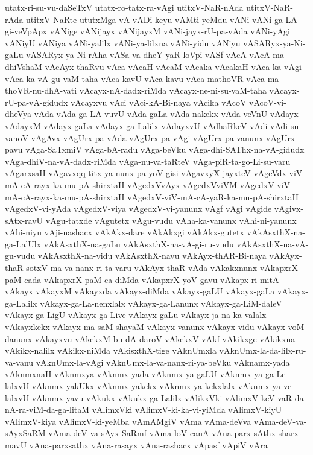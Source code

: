 {utatx-ri-su-vu-daSeTxV
utatx-ro-tatx-ra-vAgi
utitxV-NaR-nAda
utitxV-NaR-rAda
utitxV-NaRte
ututxMga
vA
vADi-keyu
vAMti-yeMdu
vANi
vANi-ga-LA-gi-veVpApx
vANige
vANijayx
vANijayxM
vANi-jayx-rU-pa-vAda
vANi-yAgi
vANiyU
vANiya
vANi-yalilx
vANi-ya-lilxna
vANi-yidu
vANiyu
vASARyx-ya-Ni-gaLu
vASARyx-ya-Ni-rAha
vASa-va-dheY-yaR-loVpi
vASf
vAcA
vAcA-ma-dhiVshaM
vAcAyx-thaRvu
vAca
vAcaH
vAcaM
vAcaka
vAcakaH
vAca-ka-vAgi
vAca-ka-vA-gu-vaM-taha
vAca-kavU
vAca-kavu
vAca-mathoVR
vAca-ma-thoVR-nu-dhA-vati
vAcayx-nA-dadx-riMda
vAcayx-ne-ni-su-vaM-taha
vAcayx-rU-pa-vA-gidudx
vAcayxvu
vAci
vAci-kA-Bi-naya
vAcika
vAcoV
vAcoV-vi-dheVya
vAda
vAda-ga-LA-vuvU
vAda-gaLa
vAda-nakekx
vAda-veVnU
vAdayx
vAdayxM
vAdayx-gaLa
vAdayx-ga-Lalilx
vAdayxvU
vAdhaRkeV
vAdi
vAdi-su-vanoV
vAgAvx
vAgUrx-pa-vAda
vAgUrx-pa-vAgi
vAgUrx-pa-vanunx
vAgUrx-pavu
vAga-SaTxmiV
vAga-bA-radu
vAga-beVku
vAga-dhi-SAThx-na-vA-gidudx
vAga-dhiV-na-vA-dadx-riMda
vAga-nu-va-taRteV
vAga-piR-ta-go-Li-su-varu
vAgarxsaH
vAgavxqq-titx-ya-nunx-pa-yoV-gisi
vAgavxyX-jayxteV
vAgeVdx-viV-mA-cA-rayx-ka-mu-pA-shirxtaH
vAgedxVvAyx
vAgedxVviVM
vAgedxV-viV-mA-cA-rayx-ka-mu-pA-shirxtaH
vAgedxV-viV-mA-cA-yaR-ka-mu-pA-shirxtaH
vAgedxV-vi-yAda
vAgedxV-viya
vAgedxV-vi-yanunx
vAgf
vAgi
vAgide
vAgivx-sAtx-ravU
vAgu-tatxde
vAgutetx
vAgu-vudu
vAha-ka-vanunx
vAhi-ni-yanunx
vAhi-niyu
vAji-nashacx
vAkAkx-dare
vAkAkxgi
vAkAkx-gutetx
vAkAsxthX-na-ga-LalUlx
vAkAsxthX-na-gaLu
vAkAsxthX-na-vA-gi-ru-vudu
vAkAsxthX-na-vA-gu-vudu
vAkAsxthX-na-vidu
vAkAsxthX-navu
vAkAyx-thAR-Bi-naya
vAkAyx-thaR-sotxV-ma-va-nanx-ri-ta-varu
vAkAyx-thaR-vAda
vAkakxnunx
vAkapxrX-paM-cada
vAkapxrX-paM-ca-diMda
vAkapxrX-yoV-gavu
vAkapx-ri-mitA
vAkayx
vAkayxM
vAkayxda
vAkayx-diMda
vAkayx-gaLU
vAkayx-gaLa
vAkayx-ga-Lalilx
vAkayx-ga-La-nenxlalx
vAkayx-ga-Lanunx
vAkayx-ga-LiM-daleV
vAkayx-ga-LigU
vAkayx-ga-Live
vAkayx-gaLu
vAkayx-ja-na-ka-valalx
vAkayxkekx
vAkayx-ma-saM-shayaM
vAkayx-vanunx
vAkayx-vidu
vAkayx-voM-danunx
vAkayxvu
vAkekxM-bu-dA-daroV
vAkekxV
vAkf
vAkikxge
vAkikxna
vAkikx-nalilx
vAkikx-niMda
vAkisxthX-tige
vAknUmxla
vAknUmx-la-da-lilx-ru-va-vanu
vAknUmx-la-vAgi
vAknUmx-la-va-nanx-ri-ya-beVku
vAknamx-yada
vAknmxnaH
vAknmxya
vAknmx-yada
vAknmx-ya-gaLU
vAknmx-ya-ga-Le-lalxvU
vAknmx-yakUkx
vAknmx-yakekx
vAknmx-ya-kekxlalx
vAknmx-ya-ve-lalxvU
vAknmx-yavu
vAkukx
vAkukx-ga-Lalilx
vAlikxVki
vAlimxV-keV-vaR-da-nA-ra-viM-da-ga-litaM
vAlimxVki
vAlimxV-ki-ka-vi-yiMda
vAlimxV-kiyU
vAlimxV-kiya
vAlimxV-ki-yeMba
vAmAMgiV
vAma
vAma-deVva
vAma-deV-va-sAyxSaRM
vAma-deV-va-sAyx-SaRmf
vAma-loV-canA
vAna-parx-sAthx-sharx-mavU
vAna-parxsathx
vAna-rasayx
vAna-rashacx
vApasf
vApiV
vAra
}
